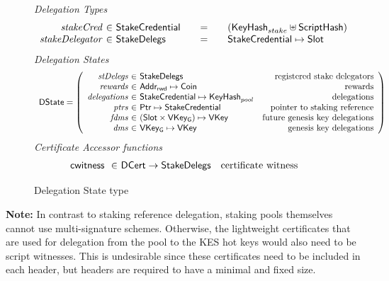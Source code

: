 \documentclass[11pt,a4paper,dvipsnames,twosided]{article}
\newcommand{\khcomment}[1]{\todo[color=blue!20]{KH: #1}}
\newcommand{\Coin}{\type{Coin}}
\newcommand{\Slot}{\type{Slot}}
\newcommand{\StakeDelegs}{\type{StakeDelegs}}
\newcommand{\StakeObject}{\type{StakeCredential}}
\newcommand{\DCert}{\type{DCert}}
\newcommand{\AddrRWD}{\type{Addr_{rwd}}}
\newcommand{\HashScr}{\type{ScriptHash}}
\newcommand{\Ptr}{\type{Ptr}}
\newcommand{\DState}{\type{DState}}
\newcommand{\VKey}{\type{VKey}}
\newcommand{\VKeyGen}{\type{VKey_G}}
\newcommand{\KeyHash}{\type{KeyHash}}
\newcommand{\cwitness}[1]{\fun{cwitness}~ \var{#1}}
\theoremstyle{definition}
\begin{document}
\begin{figure}
  \emph{Delegation Types}
    \begin{equation*}
      \begin{array}{r@{~\in~}l@{\qquad=\qquad}lr}
        \var{stakeCred} & \StakeObject & (\KeyHash_{stake} \uniondistinct
                                            \HashScr) \\
        \var{stakeDelegator} & \StakeDelegs & \StakeObject \mapsto \Slot \\
      \end{array}
    \end{equation*}
  \emph{Delegation States}
  \begin{equation*}
    \begin{array}{l}
    \DState =
    \left(\begin{array}{r@{~\in~}lr}
      \var{stDelegs} & \StakeDelegs & \text{registered stake delegators}\\
      \var{rewards} & \AddrRWD \mapsto \Coin & \text{rewards}\\
      \var{delegations} & \StakeObject \mapsto \KeyHash_{pool} & \text{delegations}\\
      \var{ptrs} & \Ptr \mapsto \StakeObject & \text{pointer to staking reference}\\
      \var{fdms} & (\Slot\times\VKeyGen) \mapsto \VKey & \text{future genesis key delegations}\\
      \var{dms} & \VKeyGen \mapsto \VKey & \text{genesis key delegations}\\
          \end{array}\right)
    \end{array}
  \end{equation*}
  \emph{Certificate Accessor functions}
  \begin{equation*}
  \begin{array}{r@{~\in~}lr}
    \cwitness{} & \DCert \to \StakeDelegs & \text{certificate witness}
  \end{array}
  \end{equation*}
  \caption{Delegation State type}
  \label{fig:delegation-state-type}
\end{figure}

\textbf{Note:} In contrast to staking reference delegation, staking pools
themselves cannot use multi-signature schemes. Otherwise, the lightweight
certificates that are used for delegation from the pool to the KES hot keys would also need to be
script witnesses. This is undesirable since these certificates need to be included in each header,
but headers are required to have a minimal and fixed size. %
\end{document}
